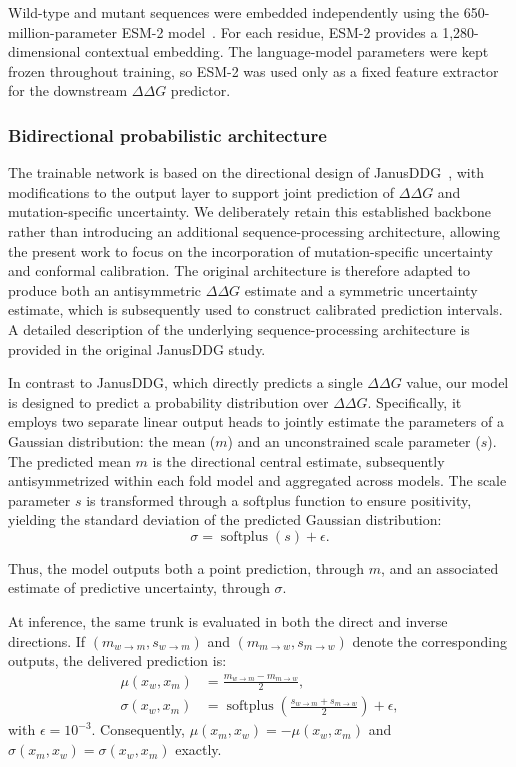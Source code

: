 \documentclass[11pt]{article}
\begin{document}
Wild-type and mutant sequences were embedded independently using the 650-million-parameter ESM-2 model~\citep{lin2023evolutionary}. For each residue, ESM-2 provides a 1,280-dimensional contextual embedding. The language-model parameters were kept frozen throughout training, so ESM-2 was used only as a fixed feature extractor for the downstream $\Delta\Delta G$ predictor.


\subsubsection{Bidirectional probabilistic architecture}

The trainable network is based on the directional design of JanusDDG~\citep{barducci2026janusddg}, with modifications to the output layer to support joint prediction of \(\Delta\Delta G\) and mutation-specific uncertainty. We deliberately retain this established backbone rather than
introducing an additional sequence-processing architecture, allowing the present
work to focus on the incorporation of mutation-specific uncertainty and
conformal calibration. The original architecture is therefore adapted to produce
both an antisymmetric $\Delta\Delta G$ estimate and a symmetric uncertainty
estimate, which is subsequently used to construct calibrated prediction
intervals. A detailed description of the underlying sequence-processing
architecture is provided in the original JanusDDG study.

In contrast to JanusDDG, which directly predicts a single \(\Delta\Delta G\) value, our model is designed to predict a probability distribution over \(\Delta\Delta G\). Specifically, it employs two separate linear output heads to jointly estimate the parameters of a Gaussian distribution: the mean (\(m\)) and an unconstrained scale parameter (\(s\)). The predicted mean \(m\) is the directional central estimate, subsequently antisymmetrized within each fold model and aggregated across models. The scale parameter \(s\) is transformed through a softplus function to ensure positivity, yielding the standard deviation of the predicted Gaussian distribution: \begin{equation}
    \sigma = \operatorname{softplus}(s) + \epsilon.
\end{equation}

Thus, the model outputs both a point prediction, through \(m\), and an associated estimate of predictive uncertainty, through \(\sigma\).


At inference, the same trunk is evaluated in both the direct and inverse directions. If $(m_{w\to m},s_{w\to m})$ and
$(m_{m\to w},s_{m\to w})$ denote the corresponding outputs, the delivered prediction is:
\begin{align}
\mu(x_w,x_m) &= \frac{m_{w\to m}-m_{m\to w}}{2}, \\
\sigma(x_w,x_m) &= \operatorname{softplus}\!\left(\frac{s_{w\to m}+s_{m\to w}}{2}\right)+\epsilon,
\end{align}
with $\epsilon=10^{-3}$. Consequently,
$\mu(x_m,x_w)=-\mu(x_w,x_m)$ and
$\sigma(x_m,x_w)=\sigma(x_w,x_m)$ exactly.
\end{document}
